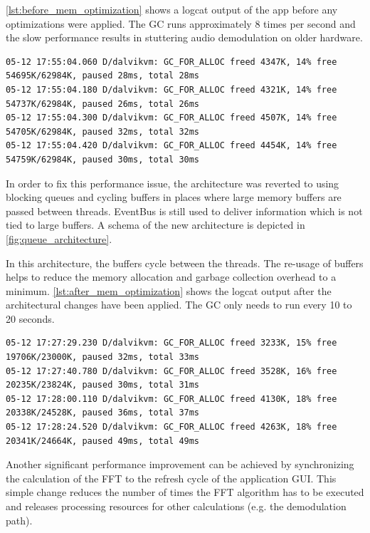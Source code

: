 \autoref{lst:before_mem_optimization} shows a logcat output of the
app before any optimizations were applied. The \ac{GC} runs approximately 8 times per second
and the slow performance results in stuttering audio demodulation on
older hardware.

\begin{lstlisting}[label=lst:before_mem_optimization, caption=Logcat output
before memory optimizations, language=none]
05-12 17:55:04.060 D/dalvikvm: GC_FOR_ALLOC freed 4347K, 14% free 54695K/62984K, paused 28ms, total 28ms
05-12 17:55:04.180 D/dalvikvm: GC_FOR_ALLOC freed 4321K, 14% free 54737K/62984K, paused 26ms, total 26ms
05-12 17:55:04.300 D/dalvikvm: GC_FOR_ALLOC freed 4507K, 14% free 54705K/62984K, paused 32ms, total 32ms
05-12 17:55:04.420 D/dalvikvm: GC_FOR_ALLOC freed 4454K, 14% free 54759K/62984K, paused 30ms, total 30ms
\end{lstlisting}

In order to fix this performance issue, the architecture was reverted
to using blocking queues and cycling buffers in places where large memory buffers are passed
between threads. EventBus is still used to deliver information
which is not tied to large buffers. A schema of the new architecture
is depicted in \autoref{fig:queue_architecture}.

In this architecture, the buffers cycle between the threads. The re-usage
of buffers helps to reduce the memory allocation and garbage collection
overhead to a minimum. \autoref{lst:after_mem_optimization} shows the
logcat output after the architectural changes have been applied. The \ac{GC}
only needs to run every 10 to 20 seconds.


\begin{lstlisting}[label=lst:after_mem_optimization, caption=Logcat output
after memory optimizations, language=none]
05-12 17:27:29.230 D/dalvikvm: GC_FOR_ALLOC freed 3233K, 15% free 19706K/23000K, paused 32ms, total 33ms
05-12 17:27:40.780 D/dalvikvm: GC_FOR_ALLOC freed 3528K, 16% free 20235K/23824K, paused 30ms, total 31ms
05-12 17:28:00.110 D/dalvikvm: GC_FOR_ALLOC freed 4130K, 18% free 20338K/24528K, paused 36ms, total 37ms
05-12 17:28:24.520 D/dalvikvm: GC_FOR_ALLOC freed 4263K, 18% free 20341K/24664K, paused 49ms, total 49ms
\end{lstlisting}

Another significant performance improvement can be achieved by synchronizing
the calculation of the \ac{FFT} to the refresh cycle of the application
\ac{GUI}. This simple change reduces the number of times the \ac{FFT} algorithm
has to be executed and releases processing resources for other calculations
(e.g. the demodulation path). 

